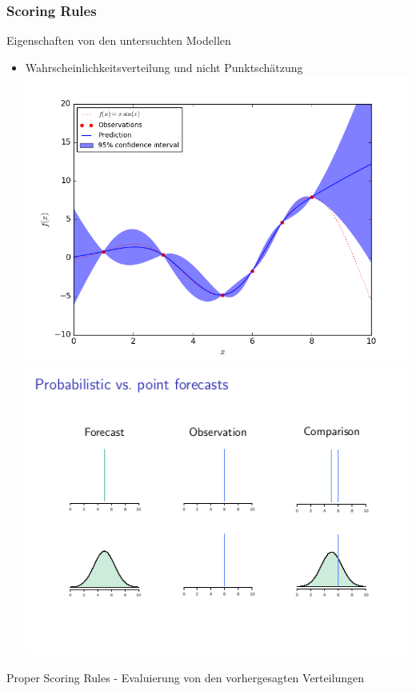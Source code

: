 \documentclass[18pt]{beamer}
\begin{document}
\begin{frame}
  \frametitle{Scoring Rules}
  Eigenschaften von den untersuchten Modellen
  \begin{itemize}
  \item Wahrscheinlichkeitsverteilung und nicht Punktschätzung
    \includegraphics[scale=0.3]{images/graph_1}
    \includegraphics[scale=0.3]{images/graph_2}
  \end{itemize}
  Proper Scoring Rules - Evaluierung von den vorhergesagten Verteilungen
\end{frame}
\end{document}
